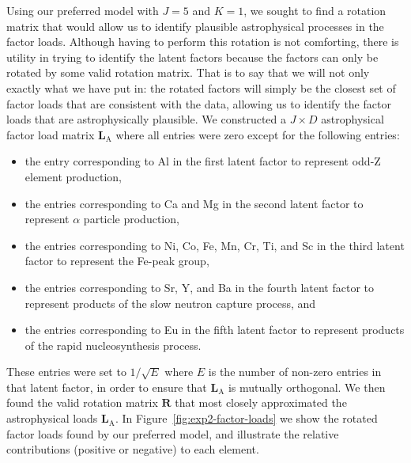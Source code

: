 \documentclass[twocolumn]{aastex62}
\newcommand{\vect}[1]{\boldsymbol{\mathbf{#1}}}
\renewcommand{\vec}[1]{\vect{#1}}
\newcommand{\factorloads}{\textbf{L}}
\begin{document}
Using our preferred model with $J = 5$ and $K = 1$, we sought to find a
rotation matrix that would allow us to identify plausible astrophysical
processes in the factor loads.
Although having to perform this rotation is not comforting, there is utility in
trying to identify the latent factors because the factors can only be rotated by
some valid rotation matrix. That is to say that we will not only exactly what
we have put in: the rotated factors will simply be the closest set of factor
loads that are consistent with the data, allowing us to identify the factor
loads that are astrophysically plausible. We constructed
a $J \times D$ astrophysical factor load matrix $\factorloads_\textrm{A}$ where
all entries were zero except for the following entries:
\begin{itemize}
	\item the entry corresponding to Al in the first latent factor to represent
		  odd-Z element production,
	\item the entries corresponding to Ca and Mg in the second latent factor to
		  represent $\alpha$ particle production,
	\item the entries corresponding to Ni, Co, Fe, Mn, Cr, Ti, and Sc in the third
		  latent factor to represent the Fe-peak group,
	\item the entries corresponding to Sr, Y, and Ba in the fourth latent factor
		  to represent products of the slow neutron capture process, and
	\item the entries corresponding to Eu in the fifth latent factor to represent
		  products of the rapid nucleosynthesis process.
\end{itemize}
These entries were set to $1/\sqrt{E}$ where $E$ is the number of non-zero entries
in that latent factor, in order to ensure that $\factorloads_\textrm{A}$ is
mutually orthogonal. We then found the valid rotation matrix $\vec{R}$ that most
closely approximated the astrophysical loads $\factorloads_\textrm{A}$.
In Figure~\ref{fig:exp2-factor-loads} we show the rotated factor loads found by our
preferred model, and illustrate the relative contributions (positive or negative)
to each element.
\end{document}
